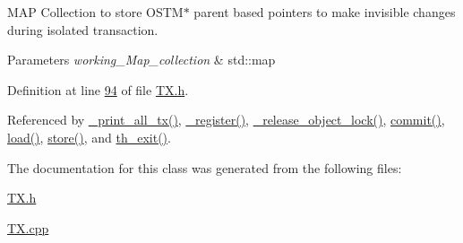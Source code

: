 M\+AP Collection to store O\+S\+T\+M$\ast$ parent based pointers to make invisible changes during isolated transaction. 


\begin{DoxyParams}{Parameters}
{\em working\+\_\+\+Map\+\_\+collection} & std\+::map \\
\hline
\end{DoxyParams}


Definition at line \hyperlink{_t_x_8h_source_l00094}{94} of file \hyperlink{_t_x_8h_source}{T\+X.\+h}.



Referenced by \hyperlink{_t_x_8cpp_source_l00346}{\+\_\+print\+\_\+all\+\_\+tx()}, \hyperlink{_t_x_8cpp_source_l00104}{\+\_\+register()}, \hyperlink{_t_x_8cpp_source_l00286}{\+\_\+release\+\_\+object\+\_\+lock()}, \hyperlink{_t_x_8cpp_source_l00202}{commit()}, \hyperlink{_t_x_8cpp_source_l00155}{load()}, \hyperlink{_t_x_8cpp_source_l00178}{store()}, and \hyperlink{_t_x_8cpp_source_l00052}{th\+\_\+exit()}.



The documentation for this class was generated from the following files\+:\begin{DoxyCompactItemize}
\item 
\hyperlink{_t_x_8h}{T\+X.\+h}\item 
\hyperlink{_t_x_8cpp}{T\+X.\+cpp}\end{DoxyCompactItemize}
